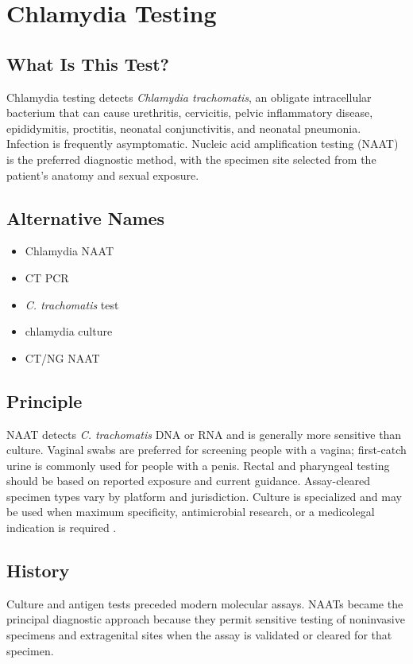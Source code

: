 \chapter{Chlamydia Testing}

\section*{What Is This Test?}
Chlamydia testing detects \textit{Chlamydia trachomatis}, an obligate intracellular bacterium that can cause urethritis, cervicitis, pelvic inflammatory disease, epididymitis, proctitis, neonatal conjunctivitis, and neonatal pneumonia. Infection is frequently asymptomatic. Nucleic acid amplification testing (NAAT) is the preferred diagnostic method, with the specimen site selected from the patient's anatomy and sexual exposure.

\section*{Alternative Names}
\begin{itemize}
  \item Chlamydia NAAT
  \item CT PCR
  \item \textit{C. trachomatis} test
  \item chlamydia culture
  \item CT/NG NAAT
\end{itemize}
\section*{Principle}
NAAT detects \textit{C. trachomatis} DNA or RNA and is generally more sensitive than culture. Vaginal swabs are preferred for screening people with a vagina; first-catch urine is commonly used for people with a penis. Rectal and pharyngeal testing should be based on reported exposure and current guidance. Assay-cleared specimen types vary by platform and jurisdiction. Culture is specialized and may be used when maximum specificity, antimicrobial research, or a medicolegal indication is required \cite{workowski2021sexually}.

\section*{History}
Culture and antigen tests preceded modern molecular assays. NAATs became the principal diagnostic approach because they permit sensitive testing of noninvasive specimens and extragenital sites when the assay is validated or cleared for that specimen.

